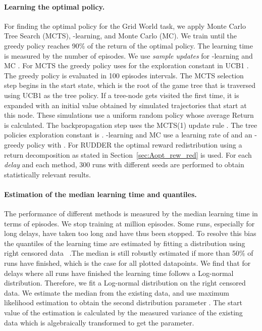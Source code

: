 \documentclass{article}
\begin{document}
\begin{appendices}
\begin{figure}[htp]
\end{figure}



\paragraph{Learning the optimal policy.} 
For finding the optimal policy for the Grid World task, 
we apply Monte Carlo Tree Search (MCTS), 
-learning, and Monte Carlo (MC). 
We train until the greedy policy reaches 90\% of the return of the optimal policy. The learning time is measured by the number of episodes.
We use {\em sample updates} for -learning and MC \cite{Sutton:18book}. 
For MCTS the greedy policy uses  for the exploration constant in UCB1 \cite{Kocsis:06}.
The greedy policy is evaluated in 100 episodes intervals. 
The MCTS selection step begins in the start state, 
which is the root of the game tree 
that is traversed using UCB1 \cite{Kocsis:06} as the tree policy. 
If a tree-node gets visited the first time, 
it is expanded with an initial value obtained by  simulated trajectories that start at this node. 
These simulations use a uniform random policy whose average Return is calculated. 
The backpropagation step uses the MCTS(1) update rule \cite{Khandelwal:16}. 
The tree policies exploration constant is .
-learning and MC use a learning rate of  and an 
-greedy policy with .
For RUDDER the optimal reward redistribution using 
a return decomposition as stated 
in Section~\ref{sec:Aopt_rew_red}
is used. For each {\em delay} and each method, 300 runs with different seeds are performed to obtain statistically relevant results.

\paragraph{Estimation of the median learning time and quantiles.}
\label{sec:Alr_estimation}
The performance of different methods is measured by 
the median learning time in terms of episodes.
We stop training at  million episodes. 
Some runs, especially for long delays, have taken too long 
and have thus been stopped. To resolve this bias the quantiles of the 
learning time are estimated by fitting a distribution using right censored data~\cite{gijbels2010censored} .The median is still robustly estimated 
if more than 50\% of runs have finished, 
which is the case for all plotted datapoints.
We find that for delays where all runs have finished 
the learning time follows a Log-normal distribution. 
Therefore, we fit a Log-normal distribution on the right censored data. 
We estimate the median from the existing data, 
and use maximum likelihood estimation to obtain 
the second distribution parameter . 
The start value of the  estimation is calculated by 
the measured variance of the existing data 
which is algebraically transformed to get the  parameter.


\end{appendices}
\end{document}
